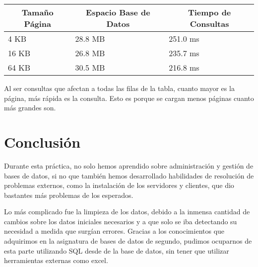 \documentclass[a4paper, 11pt, oneside]{article} %
\begin{document}
\begin{table}[H]
\centering
\begin{tabular}{|l|l|l|}
\hline
\multicolumn{1}{|c|}{Tamaño Página} & \multicolumn{1}{c|}{Espacio Base de Datos} & \multicolumn{1}{c|}{Tiempo de Consultas} \\ \hline
4 KB                                & 28.8 MB                                    & 251.0 ms                                 \\ \hline
16 KB                               & 26.8 MB                                    & 235.7 ms                                 \\ \hline
64 KB                               & 30.5 MB                                    & 216.8 ms                                 \\ \hline
\end{tabular}
\end{table}

Al ser consultas que afectan a todas las filas de la tabla, cuanto mayor es la página, más rápida es la consulta. Esto es porque se cargan menos páginas cuanto más grandes son.

\newpage


\section{Conclusión}

Durante esta práctica, no solo hemos aprendido sobre administración y gestión de bases de datos, si no que también hemos desarrollado habilidades de resolución de problemas externos, como la instalación de los servidores y clientes, que dio bastantes más problemas de los esperados.

Lo más complicado fue la limpieza de los datos, debido a la inmensa cantidad de cambios sobre los datos iniciales necesarios y a que solo se iba detectando su necesidad a medida que surgían errores. Gracias a los conocimientos que adquirimos en la asignatura de bases de datos de segundo, pudimos ocuparnos de esta parte utilizando SQL desde de la base de datos, sin tener que utilizar herramientas externas como excel.

\fi
\end{document}

